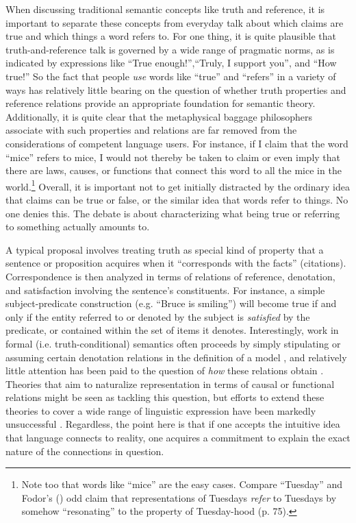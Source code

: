 When discussing traditional semantic concepts like truth and reference, it is important to separate these concepts from everyday talk about which claims are true and which things a word refers to. For one thing, it is quite plausible that truth-and-reference talk is governed by a wide range of pragmatic norms, as is indicated by expressions like ``True enough!'',``Truly, I support you'', and ``How true!'' So the fact that people \textit{use} words like ``true'' and ``refers'' in a variety of ways has relatively little bearing on the question of whether truth properties and reference relations provide an appropriate foundation for semantic theory. Additionally, it is quite clear that the metaphysical baggage philosophers associate with such properties and relations are far removed from the considerations of competent language users. For instance, if I claim that the word ``mice'' refers to mice, I would not thereby be taken to claim or even imply that there are laws, causes, or functions that connect this word to all the mice in the world.\footnote{Note too that words like ``mice'' are the easy cases. Compare ``Tuesday'' and Fodor's (\citeyear{Fodor:1998}) odd claim that representations of Tuesdays \textit{refer} to Tuesdays by somehow ``resonating'' to the property of Tuesday-hood (p. 75).} Overall, it is important not to get initially distracted by the ordinary idea that claims can be true or false, or the similar idea that words refer to things. No one denies this. The debate is about characterizing what being true or referring to something actually amounts to.

A typical proposal involves treating truth as special kind of property that a sentence or proposition acquires when it ``corresponds with the facts'' (citations). Correspondence is then analyzed in terms of relations of reference, denotation, and satisfaction involving the sentence's constituents. For instance, a simple subject-predicate construction (e.g. ``Bruce is smiling'') will become true if and only if the entity referred to or denoted by the subject is \textit{satisfied} by the predicate, or contained within the set of items it denotes. Interestingly, work in formal (i.e. truth-conditional) semantics often proceeds by simply stipulating or assuming certain denotation relations in the definition of a model \citep{Carpenter:1997}, and relatively little attention has been paid to the question of \textit{how} these relations obtain \citep{Stanley:2008}. Theories that aim to naturalize representation in terms of causal or functional relations might be seen as tackling this question, but efforts to extend these theories to cover a wide range of linguistic expression have been markedly unsuccessful \citep[c.f.][]{Millikan:2005}. Regardless, the point here is that if one accepts the intuitive idea that language connects to reality, one acquires a commitment to explain the exact nature of the connections in question.

